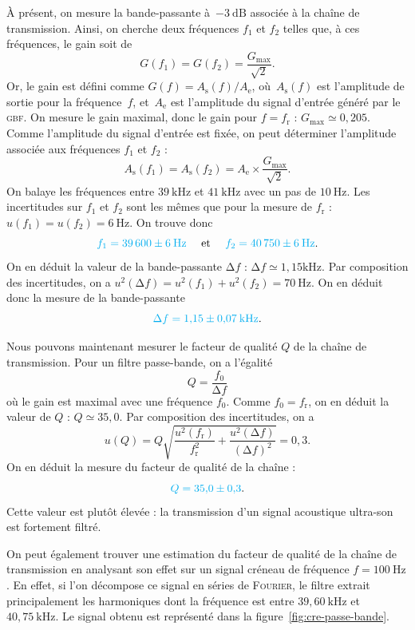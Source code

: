 \documentclass[a4paper,twocolumn,10pt]{report}
\begin{document}
	À présent, on mesure la bande-passante à~$-3\:\mathrm{dB}$\/ associée à la chaîne de transmission. Ainsi, on cherche deux fréquences $f_1$\/ et $f_2$\/ telles que, à ces fréquences, le gain soit de \[
		G(f_1) = G(f_2) = \frac{G_{\mathrm{max}}}{\sqrt{2}}
	.\] Or, le gain est défini comme $G(f) = A_{\mathrm{s}}(f)/A_\mathrm{e}$, où~$A_{\mathrm{s}}(f)$\/ est l'amplitude de sortie pour la fréquence~$f$, et~$A_{\mathrm{e}}$\/ est l'amplitude du signal d'entrée généré par le \textsc{gbf}. On mesure le gain maximal, donc le gain pour $f = f_\mathrm{r}$\/ : $G_{\mathrm{max}} \simeq 0{,}205$.
	Comme l'amplitude du signal d'entrée est fixée, on peut déterminer l'amplitude associée aux fréquences $f_1$\/ et $f_2$\/ : \[
		A_{\mathrm{s}}(f_1) = A_{\mathrm{s}}(f_2) = A_{\mathrm{e}} \times \frac{G_{\max}}{\sqrt{2}}
	.\]
	On balaye les fréquences entre $39\:\mathrm{kHz}$\/ et $41\:\mathrm{kHz}$ avec un pas de $10\:\mathrm{Hz}$. Les incertitudes sur $f_1$\/ et $f_2$\/ sont les mêmes que pour la mesure de $f_\mathrm{r}$\/ : $u(f_1) = u(f_2) = 6\:\mathrm{Hz}$. On trouve donc \[
		{\color{cyan}f_1 = 39\,600 \pm 6\:\mathrm{Hz}}\quad \text{ et }\quad {\color{cyan}f_2 = 40\,750\pm 6\:\mathrm{Hz}}
	.\] On en déduit la valeur de la bande-passante $\mathrm{\Delta}f$\/ : $\mathrm{\Delta}f \simeq 1{,}15\mathrm{kHz}$. Par composition des incertitudes, on a $u^2(\mathrm{\Delta}f) = u^2(f_1) + u^2(f_2) = 70\:\mathrm{Hz}$. On en déduit donc la mesure de la bande-passante \[
		{\color{cyan} \mathrm{\Delta}f = 1{,}15 \pm 0{,}07\:\mathrm{kHz}}
	.\]

	Nous pouvons maintenant mesurer le facteur de qualité $Q$\/ de la chaîne de transmission. Pour un filtre passe-bande, on a l'égalité \[
		Q = \frac{f_0}{\mathrm{\Delta}f}
	\] où le gain est maximal avec une fréquence $f_0$.
	Comme $f_0 = f_{\mathrm{r}}$, on en déduit la valeur de $Q$\/ : $Q \simeq 35{,}0$. Par composition des incertitudes, on a \[
		u(Q) = Q \sqrt{\frac{u^2(f_\mathrm{r})}{f^2_{\mathrm{r}}} + \frac{u^2(\mathrm{\Delta}f)}{(\mathrm{\Delta}f)^2}} = 0{,}3
	.\] On en déduit la mesure du facteur de qualité de la chaîne : \[
		{\color{cyan} Q = 35{,}0 \pm 0{,}3}
	.\] Cette valeur est plutôt élevée : la transmission d'un signal acoustique ultra-son est fortement filtré.

	\bigskip

	\centerline{}

	\bigskip

	On peut également trouver une estimation du facteur de qualité de la chaîne de transmission en analysant son effet sur un signal créneau de fréquence $f = 100\:\mathrm{Hz}$. En effet, si l'on décompose ce signal en séries de \textsc{Fourier}, le filtre extrait principalement les harmoniques dont la fréquence est entre $39{,}60\:\mathrm{kHz}$\/ et $40{,}75\:\mathrm{kHz}$. Le signal obtenu est représenté dans la figure~\ref{fig:cre-passe-bande}.
\end{document}
